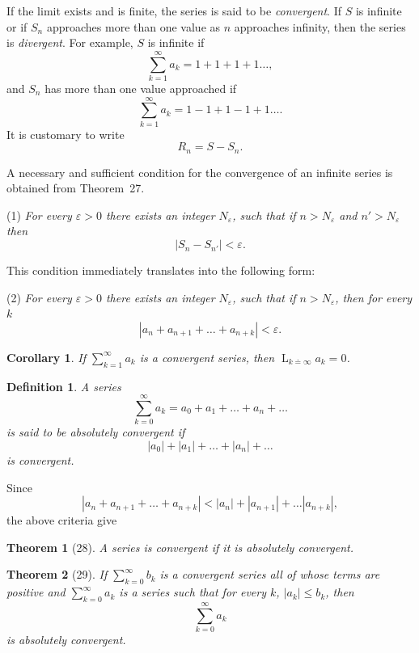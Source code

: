 \documentclass[a4paper,12pt]{book}[2004/02/16]
\providecommand{\leqq}{\leq}
\providecommand{\hyperlink}[2]{#2}
\providecommand{\hypertarget}[2]{#2}
\theoremstyle{ilemma}
\theoremstyle{itheorem}
\newtheorem{theorem}{Theorem}
\theoremstyle{iother}
\theoremstyle{icorollary}
\newtheorem{corollary}{Corollary}
\theoremstyle{numcorollary}
\theoremstyle{idefinition}
\newtheorem*{definition}{Definition}
\begin{document}
If the limit exists and is finite, the series is said to be
\textit{convergent}.  If $S$ is infinite or if $S_n$ approaches more
than one value as $n$ approaches infinity, then the series is
\textit{divergent}. For example, $S$ is infinite if
\[
  \sum_{k=1}^\infty a_k = 1 + 1 + 1 + 1 \ldots,
\]
and $S_n$ has more than one value approached if
\[
  \sum_{k=1}^\infty a_k = 1-1 + 1-1 + 1 \ldots.
\]
It is customary to write
\[
  R_n=S-S_n.
\]

A necessary and sufficient condition for the convergence of an
infinite series is obtained from Theorem~\hyperlink{thm27}{27}.

(1) \textit{For every $\varepsilon > 0$ there exists an integer
  $N_{\varepsilon}$, such that if $n > N_{\varepsilon}$ and $n' >
  N_{\varepsilon}$ then}
\[
  |S_n-S_{n'}|< \varepsilon.
\]

This condition immediately translates into the following form:

(2) \textit{For every $\varepsilon>0$ there exists an integer
  $N_\varepsilon$, such that if $n>N_\varepsilon$, then for every $k$}
\[
  |a_n + a_{n+1} + \ldots + a_{n+k}|< \varepsilon.
\]

\begin{corollary}\label{cp72}
If $\sum\limits_{k=1}^\infty a_k$ is a convergent series, then
$\displaystyle\mathop{L}_{k \doteq \infty} a_k=0$.
\end{corollary}

\begin{definition}
A series
\[
  \sum_{k=0}^\infty a_k=a_0+a_1+ \ldots+a_n+ \ldots
\]
is said to be \textit{absolutely convergent} if
\[
  |a_0|+ |a_1|+ \ldots + |a_n| + \ldots
\]
is convergent.
\end{definition}

Since
\[
  |a_n + a_{n+1} +\ldots +a_{n+k}|
  < |a_n|+ |a_{n+1}|+ \ldots|a_{n+k}|,
\]
the above criteria give

\begin{theorem}[28]\hypertarget{thm28}{}
A series is convergent if it is absolutely convergent.
\end{theorem}

\begin{theorem}[29]\hypertarget{thm29}{}
If $\sum\limits_{k=0}^\infty b_k$ is a convergent series all of whose
terms are positive and $\sum\limits_{k=0}^\infty a_k$ is a series such
that for every $k$, $|a_k|\leqq b_k$, then
\[
  \sum_{k=0}^\infty a_k
\]
is absolutely convergent.
\end{theorem}
\end{document}
